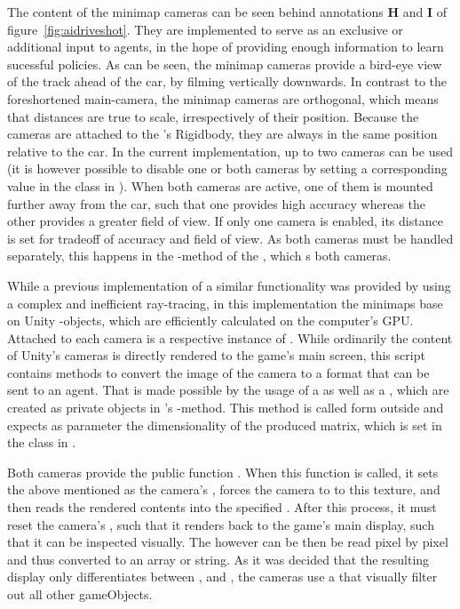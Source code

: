 The content of the minimap cameras can be seen behind annotations \textbf{H} and \textbf{I} of figure~\ref{fig:aidriveshot}. They are implemented to serve as an exclusive or additional input to agents, in the hope of providing enough information to learn sucessful policies. As can be seen, the minimap cameras provide a bird-eye view of the track ahead of the car, by filming vertically downwards. In contrast to the foreshortened main-camera, the minimap cameras are orthogonal, which means that distances are true to scale, irrespectively of their position. Because the cameras are attached to the 's Rigidbody, they are always in the same position relative to the car. In the current implementation, up to two cameras can be used (it is however possible to disable one or both cameras by setting a corresponding value in the class  in ). When both cameras are active, one of them is mounted further away from the car, such that one provides high accuracy whereas the other provides a greater field of view. If only one camera is enabled, its distance is set for tradeoff of accuracy and field of view. As both cameras must be handled separately, this happens in the -method of the , which s both cameras.

While a previous implementation of a similar functionality was provided by \leon using a complex and inefficient ray-tracing, in this implementation the minimaps base on Unity -objects, which are efficiently calculated on the computer's GPU. Attached to each camera is a respective instance of . While ordinarily the content of Unity's cameras is directly rendered to the game's main screen, this script contains methods to convert the image of the camera to a format that can be sent to an agent. That is made possible by the usage of a  as well as a , which are created as private objects in 's -method. This method is called form outside and expects as parameter the dimensionality of the produced matrix, which is set in the class  in . 

Both cameras provide the public function . When this function is called, it sets the above mentioned  as the camera's , forces the camera to  to this texture, and then reads the rendered contents into the specified . After this process, it must reset the camera's , such that it renders back to the game's main display, such that it can be inspected visually. The  however can be then be read pixel by pixel and thus converted to an array or string. As it was decided that the resulting display only differentiates between ,  and , the cameras use a  that visually filter out all other gameObjects.

